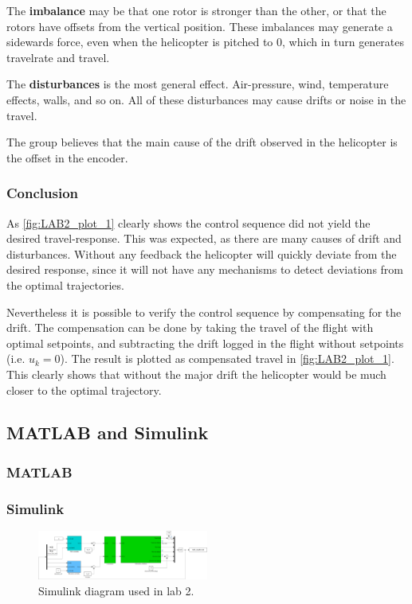 \documentclass[../main.tex]{subfiles}
\begin{document}
The \textbf{imbalance} may be that one rotor is stronger than the other, or that the rotors have offsets from the vertical position. These imbalances may generate a sidewards force, even when the helicopter is pitched to $0$, which in turn generates travelrate and travel.

The \textbf{disturbances} is the most general effect. Air-pressure, wind, temperature effects, walls, and so on. All of these disturbances may cause drifts or noise in the travel. 

The group believes that the main cause of the drift observed in the helicopter is the offset in the encoder.

\subsubsection{Conclusion}
As \cref{fig:LAB2_plot_1} clearly shows the control sequence did not yield the desired travel-response. This was expected, as there are many causes of drift and disturbances. Without any feedback the helicopter will quickly deviate from the desired response, since it will not have any mechanisms to detect deviations from the optimal trajectories.

Nevertheless it is possible to verify the control sequence by compensating for the drift. The compensation can be done by taking the travel of the flight with optimal setpoints, and subtracting the drift logged in the flight without setpoints (i.e. $ u_k = 0 $). The result is plotted as compensated travel in \cref{fig:LAB2_plot_1}. This clearly shows that without the major drift the helicopter would be much closer to the optimal trajectory.


\clearpage
\subsection{MATLAB and Simulink}
\subsubsection{MATLAB}

\clearpage
\subsubsection{Simulink}
\begin{figure}[h]
	\centering
	\includegraphics[angle=90, width=0.5\textwidth,height=0.7\textheight]{code/lab2_simulink}
	\caption{Simulink diagram used in lab 2.}
	\label{fig:lab2_simulink}
\end{figure}
\end{document}
